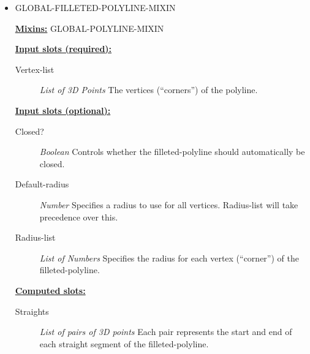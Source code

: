\documentclass [11pt]{book}
\begin{document}
\begin{itemize}
\item {}GLOBAL-FILLETED-POLYLINE-MIXIN


\textbf{
\underline{Mixins:}} GLOBAL-POLYLINE-MIXIN





\begin{description}

\end{description}








\textbf{
\underline{Input slots (required):}}

\begin{description}

\item [Vertex-list]
\emph{List of 3D Points} The vertices (``corners'') of the polyline.


\end{description}






\textbf{
\underline{Input slots (optional):}}

\begin{description}

\item [Closed?]
\emph{Boolean} Controls whether the filleted-polyline should automatically be closed.


\item [Default-radius]
\emph{Number} Specifies a radius to use for all vertices. Radius-list will take precedence over this.


\item [Radius-list]
\emph{List of Numbers} Specifies the radius for each vertex (``corner'') of the filleted-polyline.


\end{description}






\textbf{
\underline{Computed slots:}}

\begin{description}

\item [Straights]
\emph{List of pairs of 3D points} Each pair represents the start and end of each straight segment of the
filleted-polyline.



\end{description}
\end{itemize}
\end{document}
